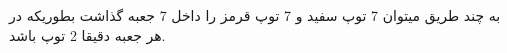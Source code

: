 به چند طریق میتوان 7 توپ سفید و 7 توپ قرمز را داخل 7 جعبه گذاشت بطوریکه در هر جعبه دقیقا 2 توپ باشد.